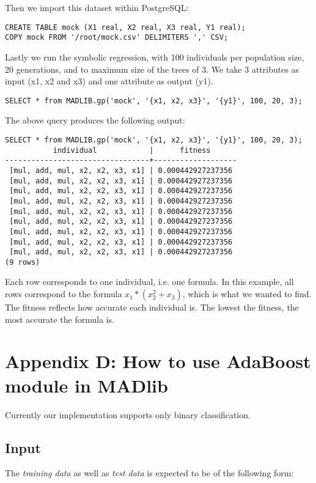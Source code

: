 {\raggedleft Then we import this dataset within PostgreSQL:}
\begin{verbatim}
CREATE TABLE mock (X1 real, X2 real, X3 real, Y1 real);
COPY mock FROM '/root/mock.csv' DELIMITERS ',' CSV;
\end{verbatim}

{\raggedleft Lastly we run the symbolic regression, with 100 individuals per population size, 20 generations, and to maximum size of the trees of 3. We take 3 attributes as input (x1, x2 and x3) and one attribute as output (y1).}
\begin{verbatim}
SELECT * from MADLIB.gp('mock', '{x1, x2, x3}', '{y1}', 100, 20, 3);
\end{verbatim}

{\raggedleft The above query produces the following output:}
\begin{verbatim}
SELECT * from MADLIB.gp('mock', '{x1, x2, x3}', '{y1}', 100, 20, 3);
           individual            |      fitness
---------------------------------+-------------------
 [mul, add, mul, x2, x2, x3, x1] | 0.000442927237356
 [mul, add, mul, x2, x2, x3, x1] | 0.000442927237356
 [mul, add, mul, x2, x2, x3, x1] | 0.000442927237356
 [mul, add, mul, x2, x2, x3, x1] | 0.000442927237356
 [mul, add, mul, x2, x2, x3, x1] | 0.000442927237356
 [mul, add, mul, x2, x2, x3, x1] | 0.000442927237356
 [mul, add, mul, x2, x2, x3, x1] | 0.000442927237356
 [mul, add, mul, x2, x2, x3, x1] | 0.000442927237356
 [mul, add, mul, x2, x2, x3, x1] | 0.000442927237356
(9 rows)
\end{verbatim}

Each row corresponds to one individual, i.e. one formula. In this example, all rows correspond to the formula $x_1*(x_2^2+x_3)$, which is what we wanted to find. The fitness reflects how accurate each individual is. The lowest the fitness, the most accurate the formula is.


\section*{Appendix D: How to use AdaBoost module in MADlib}
Currently our implementation supports only binary classification.

\subsection*{Input}
The {\itshape training data} as well as {\itshape test data} is expected to be of the following form:

